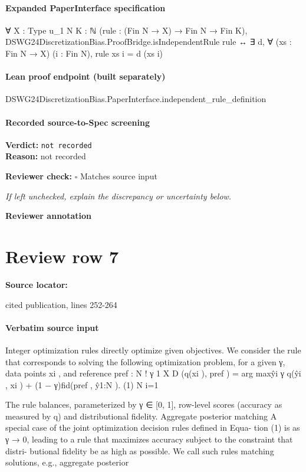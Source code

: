 \documentclass[10pt]{article}
\newcommand{\reviewerbox}{%
  \par\noindent\fbox{\parbox{0.96\linewidth}{\rule{0pt}{0.38in}}}\par
}
\newcommand{\reviewmatch}[1]{%
  \par\noindent\textbf{Reviewer check:} $\square$\; #1\par
  \noindent\emph{If left unchecked, explain the discrepancy or uncertainty below.}\par
}
\begin{document}
\paragraph{Expanded PaperInterface specification}
\begin{ReviewVerbatim}
∀ {X : Type u_1} {N K : ℕ} (rule : (Fin N → X) → Fin N → Fin K),
  DSWG24DiscretizationBias.ProofBridge.isIndependentRule rule ↔
    ∃ d, ∀ (xs : Fin N → X) (i : Fin N), rule xs i = d (xs i)
\end{ReviewVerbatim}

\paragraph{Lean proof endpoint (built separately)}\begin{ReviewVerbatim}
DSWG24DiscretizationBias.PaperInterface.independent_rule_definition
\end{ReviewVerbatim}

\paragraph{Recorded source-to-Spec screening}
\textbf{Verdict:} \texttt{not recorded}
\\
\textbf{Reason:} not recorded
\reviewmatch{Matches source input}
\noindent\textbf{Reviewer annotation}\par
\reviewerbox
\clearpage
\hypertarget{source-claim-39ae869114aca78a}{}
\section*{Review row 7}
\textbf{Source locator:} {\footnotesize\raggedright cited publication, lines 252-\allowbreak{}264\par}
\paragraph{Verbatim source input}
\begin{ReviewVerbatim}
Integer optimization rules directly optimize given objectives. We consider the rule that corresponds to
     solving the following optimization problem, for a given γ, data points {xi }, and reference pref :
                                                            N
                                                                           !
                      γ                                  1 X
                   D ({q(xi )}, pref ) = arg max{ŷi } γ       q(ŷi , xi ) + (1 − γ)fid(pref , ŷ1:N ). (1)
                                                         N i=1

     The rule balances, parameterized by γ ∈ [0, 1], row-level scores (accuracy as measured by q) and
     distributional fidelity.
Aggregate posterior matching A special case of the joint optimization decision rules defined in Equa-
    tion (1) is as γ → 0, leading to a rule that maximizes accuracy subject to the constraint that distri-
    butional fidelity be as high as possible. We call such rules matching solutions, e.g., aggregate posterior
\end{ReviewVerbatim}
\end{document}
